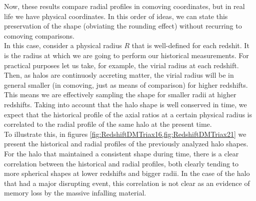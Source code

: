 Now, these results compare radial profiles in comoving coordinates, but in real life we have physical coordinates. In this order of ideas, we can state this preservation of the shape (obviating the rounding effect) without recurring to comoving comparisons.\\

In this case, consider a physical radius $R$ that is well-defined for each redshit. It is the radius at which we are going to perform our historical measurements. For practical purposes let us take, for example, the virial radius at each redshift. Then, as halos are continuosly accreting matter, the virial radius will be in general smaller (in comoving, just as means of comparison) for higher redshifts. This means we are effectively sampling the shape for smaller radii at higher redshifts. Taking into account that the halo shape is well conserved in time, we expect that the historical profile of the axial ratios at a certain physical radius is correlated to the radial profile of the same halo at the present time. \\

To illustrate this, in figures \ref{fig:RedshiftDMTriax16,fig:RedshiftDMTriax21} we present the historical and radial profiles of the previously analyzed halo shapes. For the halo that maintained a consistent shape during time, there is a clear correlation between the historical and radial profiles, both clearly tending to more spherical shapes at lower redshifts and bigger radii. In the case of the halo that had a major disrupting event, this correlation is not clear as an evidence of memory loss by the massive infalling material.\\  


